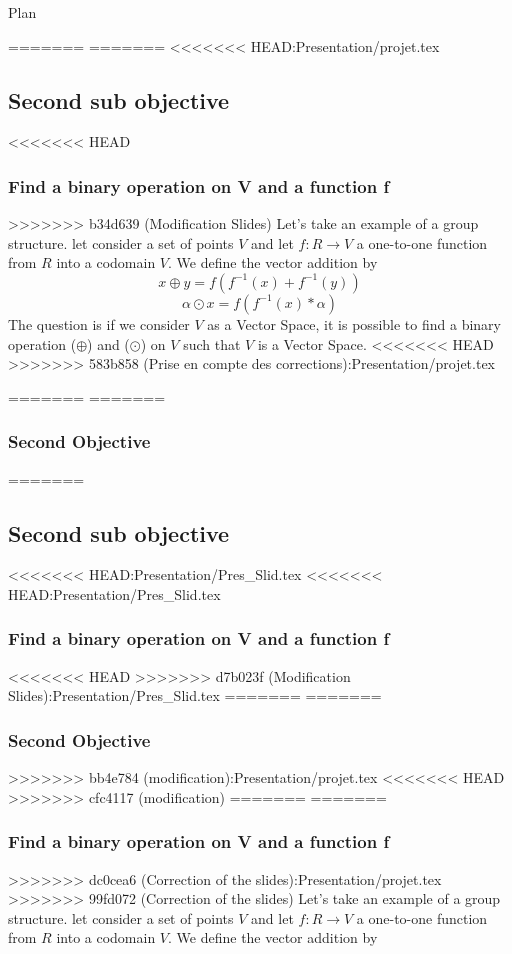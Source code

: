 \documentclass{beamer}
\begin{document}
\begin{frame}{Plan}
\begin{frame}
\begin{frame}
\begin{frame}
\begin{frame}
\begin{frame}
\begin{frame}
\begin{frame}
=======
=======
<<<<<<< HEAD:Presentation/projet.tex
\subsection{Second sub objective}
\begin{frame}
<<<<<<< HEAD
    \frametitle{Find a binary operation on V and a function f }
>>>>>>> b34d639 (Modification Slides)
    Let's take an example of a group structure.
    let consider a set of points  $ V $ and let  $ f: R \rightarrow V $ a one-to-one
    function from $R$ into a codomain $V$. We define the vector addition by
    $$ x \oplus y = f(f^{-1}(x) + f^{-1}(y)) $$
    $$ \alpha \odot x = f(f^{-1}(x) * \alpha) $$
    The question is if we consider $V$ as a Vector Space, it is possible to find a binary operation ($\oplus$) and ($\odot$) on $V$ such that $V$ is a Vector Space.
<<<<<<< HEAD
>>>>>>> 583b858 (Prise en compte des corrections):Presentation/projet.tex
\end{frame}
=======
=======
    \frametitle{Second Objective}
=======



\subsection{Second sub objective}
\begin{frame}
<<<<<<< HEAD:Presentation/Pres_Slid.tex
<<<<<<< HEAD:Presentation/Pres_Slid.tex
    \frametitle{Find a binary operation on V and a function f }
<<<<<<< HEAD
>>>>>>> d7b023f (Modification Slides):Presentation/Pres_Slid.tex
=======
=======
    \frametitle{Second Objective}
>>>>>>> bb4e784 (modification):Presentation/projet.tex
<<<<<<< HEAD
>>>>>>> cfc4117 (modification)
=======
=======
    \frametitle{Find a binary operation on V and a function f }
>>>>>>> dc0cea6 (Correction of the slides):Presentation/projet.tex
>>>>>>> 99fd072 (Correction of the slides)
	Let's take an example of a group structure.
	let consider a set of points  $ V $ and let  $ f: R \rightarrow V $ a one-to-one
	function from $R$ into a codomain $V$. We define the vector addition by
	

\end{frame}
\end{frame}
\end{frame}
\end{frame}
\end{frame}
\end{frame}
\end{frame}
\end{frame}
\end{frame}
\end{document}
